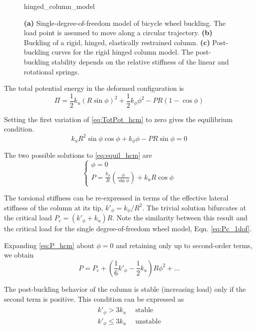 \documentclass[\rootdir/thesis.tex]{subfiles}
\begin{document}
\begin{figure}[h]
\centering
{hinged_column_model}
\caption{\textbf{(a)} Single-degree-of-freedom model of bicycle wheel buckling. The load point is assumed to move along a circular trajectory. \textbf{(b)} Buckling of a rigid, hinged, elastically restrained column. \textbf{(c)} Post-buckling curves for the rigid hinged column model. The post-buckling stability depends on the relative stiffness of the linear and rotational springs.}
\label{fig:hinged_column_model}
\end{figure}

The total potential energy in the deformed configuration is
\begin{equation}
\label{eq:TotPot_hcm}
\Pi = \frac{1}{2}k_u(R\sin{\phi})^2 + \frac{1}{2}k_{\phi}\phi^2
    - PR(1-\cos{\phi})
\end{equation}

Setting the first variation of \eqref{eq:TotPot_hcm} to zero gives the equilibrium condition.
\begin{equation}
\label{eq:equil_hcm}
k_u R^2 \sin{\phi}\cos{\phi} + k_{\phi}\phi - PR\sin{\phi} = 0
\end{equation}

The two possible solutions to \eqref{eq:equil_hcm} are
\begin{equation}
\label{eq:P_hcm}
\begin{cases}
\phi = 0\\
P = \frac{k_{\phi}}{R}\left(\frac{\phi}{\sin{\phi}}\right) + k_u R\cos{\phi}
\end{cases}
\end{equation}

The torsional stiffness can be re-expressed in terms of the effective lateral stiffness of the column at its tip, $k'_{\phi}=k_{\phi}/R^2$. The trivial solution bifurcates at the critical load $P_c=(k'_{\phi} + k_u) R$. Note the similarity between this result and the critical load for the single degree-of-freedom wheel model, Eqn. \eqref{eq:Pc_1dof}.

Expanding \eqref{eq:P_hcm} about $\phi=0$ and retaining only up to second-order terms, we obtain
\begin{equation}
\label{eq:P_series_hcm}
P = P_c + \left(\frac{1}{6}k'_{\phi} - \frac{1}{2}k_u\right)R\phi^2 + ...
\end{equation}

The post-buckling behavior of the column is stable (increasing load) only if the second term is positive. This condition can be expressed as
\begin{align}
\begin{split}
\label{eq:pb_stability_hcm}
k'_{\phi} > 3k_u & \,\,\,\text{stable}\\
k'_{\phi} \leq 3k_u & \,\,\,\text{unstable}
\end{split}
\end{align}
\end{document}
